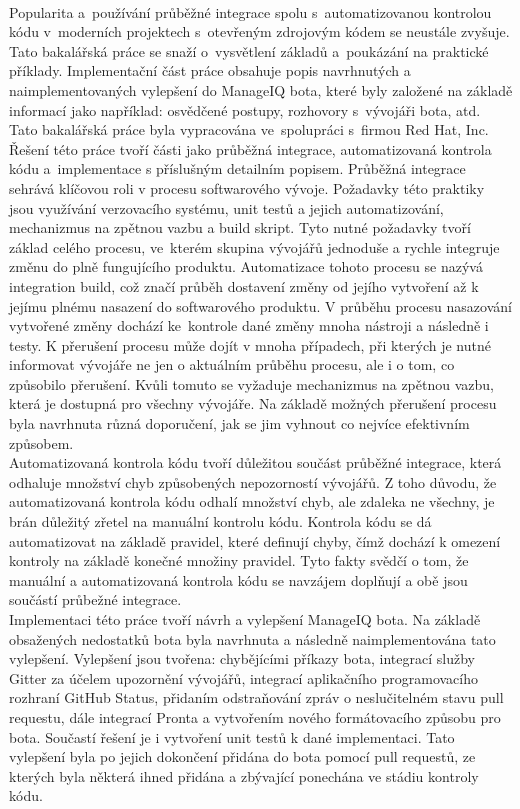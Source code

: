 \\
Popularita a~používání průběžné integrace spolu s~automatizovanou kontrolou kódu v~moderních projektech s~otevřeným zdrojovým kódem se neustále zvyšuje. Tato bakalářská práce se snaží o~vysvětlení základů a~poukázání na praktické příklady. Implementační část práce obsahuje popis navrhnutých a naimplementovaných vylepšení do ManageIQ bota, které byly založené na základě informací jako například: osvědčené postupy, rozhovory s~vývojáři bota, atd. Tato bakalářská práce byla vypracována ve~spolupráci s~firmou Red Hat, Inc.\\[1em]
\indent Řešení této práce tvoří části jako průběžná integrace, automatizovaná kontrola kódu a~implementace s příslušným detailním popisem. Průběžná integrace sehrává klíčovou roli v procesu softwarového vývoje. Požadavky této praktiky jsou využívání verzovacího systému, unit testů a jejich automatizování, mechanizmus na zpětnou vazbu a build skript. Tyto nutné požadavky tvoří základ celého procesu, ve~kterém skupina vývojářů jednoduše a rychle integruje změnu do plně fungujícího produktu. Automatizace tohoto procesu se nazývá integration build, což značí průběh dostavení změny od jejího vytvoření až k jejímu plnému nasazení do softwarového produktu. V průběhu procesu nasazování vytvořené změny dochází ke~kontrole dané změny mnoha nástroji a následně i testy. K přerušení procesu může dojít v mnoha případech, při kterých je nutné informovat vývojáře ne jen o aktuálním průběhu procesu, ale i o tom, co způsobilo přerušení. Kvůli tomuto se vyžaduje mechanizmus na zpětnou vazbu, která je dostupná pro všechny vývojáře. Na základě možných přerušení procesu byla navrhnuta různá doporučení, jak se jim vyhnout co nejvíce efektivním způsobem.\\[1em]
\indent Automatizovaná kontrola kódu tvoří důležitou součást průběžné integrace, která odhaluje množství chyb způsobených nepozorností vývojářů. Z toho důvodu, že automatizovaná kontrola kódu odhalí množství chyb, ale zdaleka ne všechny, je brán důležitý zřetel na manuální kontrolu kódu. Kontrola kódu se dá automatizovat na základě pravidel, které definují chyby, čímž dochází k omezení kontroly na základě konečné množiny pravidel. Tyto fakty svědčí o tom, že manuální a automatizovaná kontrola kódu se navzájem doplňují a obě jsou součástí průbežné integrace.\\[1em]
\indent Implementaci této práce tvoří návrh a vylepšení ManageIQ bota. Na základě obsažených nedostatků bota byla navrhnuta a následně naimplementována tato vylepšení. Vylepšení jsou tvořena: chybějícími příkazy bota, integrací služby Gitter za účelem upozornění vývojářů, integrací aplikačního programovacího rozhraní GitHub Status, přidaním odstraňování zpráv o neslučitelném stavu pull requestu, dále integrací Pronta a vytvořením nového formátovacího způsobu pro bota. Součastí řešení je i vytvoření unit testů k dané implementaci. Tato vylepšení byla po jejich dokončení přidána do bota pomocí pull requestů, ze kterých byla některá ihned přidána a zbývající ponechána ve stádiu kontroly kódu.\\[1em]
